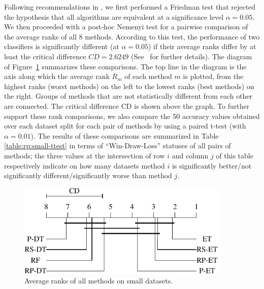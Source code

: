 Following recommendations in \citep{demsar:2006}, we first performed a
Friedman test that rejected the hypothesis that all algorithms are
equivalent at a significance level $\alpha=0.05$.
We then proceeded with a post-hoc Nemenyi test for a
pairwise comparison of the average ranks of all 8 methods. According to
this test, the performance of two classifiers is significantly
different (at $\alpha=0.05$) if their average ranks differ by at least
the critical difference $CD = 2.6249$
(See~\citep{demsar:2006} for further details). The diagram of
Figure~\ref{fig:8:small-cmp} summarizes these comparisons. The top line
in the diagram is the axis along which the average rank $R_m$ of each method $m$ is plotted,
from the highest ranks (worst methods) on the left to the lowest ranks
(best methods) on the right.  Groups of methods that are not
statistically different from each other are connected. The critical
difference CD is shown above the graph.  To further support these rank
comparisons, we also compare the 50 accuracy values obtained
over each dataset split for each pair of methods by using a paired
t-test (with $\alpha=0.01$). The results of these comparisons are
summarized in Table \ref{table:rp:small-ttest} in terms of ``Win-Draw-Loss''
statuses of all pairs of methods; the three values at the intersection
of row $i$ and column $j$ of this table respectively indicate on how
many datasets method $i$ is significantly better/not significantly
different/significantly worse than method $j$.

\begin{figure}
    \centering
    \includegraphics[width=0.9\textwidth]{figures/ch8_rank_small.pdf}
    \caption{Average ranks of all methods on small datasets.}
    \label{fig:8:small-cmp}
\end{figure}

